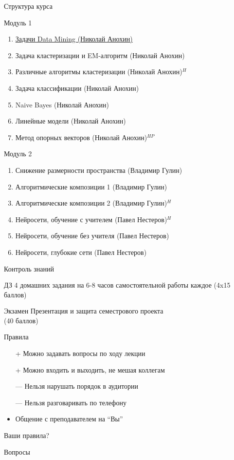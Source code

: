 \documentclass[10pt]{beamer}
\begin{document}
\begin{frame}{Структура курса}

{\small
Модуль 1
\begin{enumerate}
\item \underline{Задачи Data Mining (Николай Анохин)}
\item Задача кластеризации и EM-алгоритм (Николай Анохин)
\item Различные алгоритмы кластеризации (Николай Анохин){\color{red}$^{H}$}
\item Задача классификации (Николай Анохин)
\item Naive Bayes (Николай Анохин)
\item Линейные модели (Николай Анохин)
\item Метод опорных векторов (Николай Анохин){\color{red}$^{HP}$}
\end{enumerate}

Модуль 2
\begin{enumerate}
\item Снижение размерности пространства (Владимир Гулин)
\item Алгоритмические композиции 1 (Владимир Гулин)
\item Алгоритмические композиции 2 (Владимир Гулин){\color{red}$^{H}$}
\item Нейросети, обучение с учителем (Павел Нестеров){\color{red}$^{H}$}
\item Нейросети, обучение без учителя (Павел Нестеров)
\item Нейросети, глубокие сети (Павел Нестеров)
\end{enumerate}
}

\end{frame}

\begin{frame}{Контроль знаний}

\begin{block}{ДЗ}
4 домашних задания на 6-8 часов самостоятельной работы каждое (4x15 баллов)
\end{block}

\begin{alertblock}{Экзамен}
Презентация и защита семестрового проекта \\ (40 баллов)
\end{alertblock}

\end{frame}

\begin{frame}{Правила}

\begin{itemize}
\item[+] Можно задавать вопросы по ходу лекции
\item[+] Можно входить и выходить, не мешая коллегам
\item[---] Нельзя нарушать порядок в аудитории
\item[---] Нельзя разговаривать по телефону
\item Общение с преподавателем на ``Вы''
\end{itemize}

Ваши правила?

\end{frame}

\begin{frame}[plain]
\begin{center}
{\Large Вопросы}
\end{center}
\end{frame}
\end{document}
